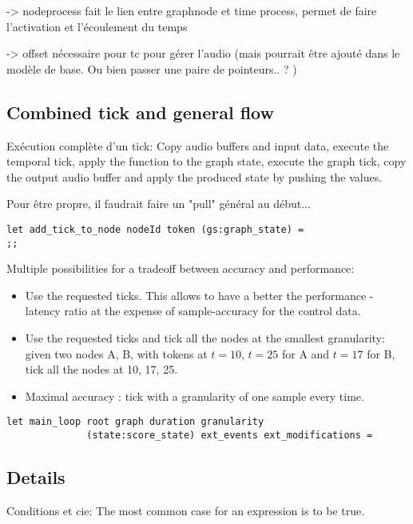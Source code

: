 \documentclass[applsci,article,submit,moreauthors,pdftex,10pt,a4paper]{mdpi}
\begin{document}
-> nodeprocess fait le lien entre graphnode et time process, permet de faire l'activation et l'écoulement du temps

-> offset nécessaire pour tc pour gérer l'audio (mais pourrait être ajouté dans le modèle de base. Ou bien passer une paire de pointeurs.. ? )

\subsection{Combined tick and general flow}
Exécution complète d'un tick: 
Copy audio buffers and input data, execute the temporal tick, apply the function to the graph state, execute the graph tick, copy the output audio buffer and apply the produced state by pushing the values.


Pour être propre, il faudrait faire un "pull" général au début...

\begin{lstlisting}
let add_tick_to_node nodeId token (gs:graph_state) =
;;
\end{lstlisting}

Multiple possibilities for a tradeoff between accuracy and performance: 
\begin{itemize}
	\item Use the requested ticks. This allows to have a better the performance - latency ratio at the expense of sample-accuracy for the control data.
	\item Use the requested ticks and tick all the nodes at the smallest granularity: 
	given two nodes A, B, with tokens at $t=10$, $t=25$ for A and $t=17$ for B, tick all the nodes at 10, 17, 25.
	\item Maximal accuracy : tick with a granularity of one sample every time.
\end{itemize}



\begin{lstlisting}
let main_loop root graph duration granularity 
			  (state:score_state) ext_events ext_modifications =

\end{lstlisting}



\subsection{Details}

Conditions et cie: The most common case for an expression is to be true.
\end{document}
